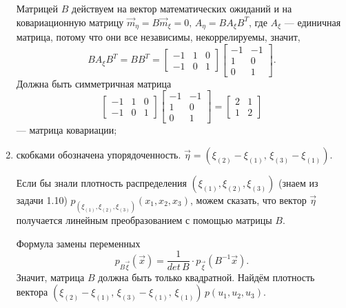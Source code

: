 \begin{enumerate}[label=\alph*)]
  Матрицей $B$ действуем на вектор математических ожиданий и на ковариационную матрицу
  $ \vec{m}_{ \eta } = B \vec{m}_{ \xi } = 0, \,
    A_{ \eta } = BA_{ \xi } B^T$,
  где $A_{ \xi }$ --- единичная матрица, потому что они все независимы, некоррелируемы, значит,
  $$BA_{ \xi } B^T =
    BB^T =
    \begin{bmatrix}
      -1 & 1 & 0 \\
      -1 & 0 & 1
    \end{bmatrix}
    \begin{bmatrix}
      -1 & -1 \\
      1 & 0 \\
      0 & 1
    \end{bmatrix}.$$
  Должна быть симметричная матрица
  $$ \begin{bmatrix}
      -1 & 1 & 0 \\
      -1 & 0 & 1
    \end{bmatrix}
    \begin{bmatrix}
      -1 & -1 \\
      1 & 0 \\
      0 & 1
    \end{bmatrix} =
    \begin{bmatrix}
      2 & 1 \\
      1 & 2
    \end{bmatrix}$$
  --- матрица ковариации;
  \item скобками обозначена упорядоченность.
  $ \vec{ \eta } =
    \left( \xi_{ \left( 2 \right) } - \xi_{ \left( 1 \right) }, \,
    \xi_{ \left( 3 \right) } - \xi_{ \left( 1 \right) } \right) $.

  Если бы знали плотность распределения
  $ \left( \xi_{ \left( 1 \right) }, \xi_{ \left( 2 \right) }, \xi_{ \left( 3 \right) } \right) $
  (знаем из задачи 1.10)
  $p_{ \left( \xi_{ \left( 1 \right) }, \xi_{ \left( 2 \right) }, \xi_{ \left( 3 \right) } \right) }
    \left( x_1, x_2, x_3 \right) $, можем сказать,
    что вектор $ \vec{ \eta }$ получается линейным преобразованием с помощью матрицы $B$.

  Формула замены переменных
  $$p_{B \vec{ \xi }} \left( \vec{x} \right) =
    \frac{1}{det \, B} \cdot p_{ \vec{ \xi }} \left( B^{-1} \vec{x} \right).$$
  Значит, матрица $B$ должна быть только квадратной.
  Найдём плотность вектора
  $ \left(
      \xi_{ \left( 2 \right) } - \xi_{ \left( 1 \right) }, \,
      \xi_{ \left( 3 \right) } - \xi_{ \left( 1 \right) }, \,
      \xi_{ \left( 1 \right) }
    \right) \,
  p \left( u_1, u_2, u_3 \right) $.


\end{enumerate}
